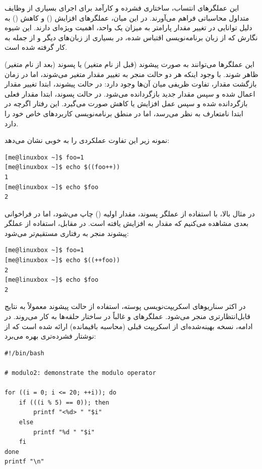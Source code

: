 این عملگرهای انتساب، ساختاری فشرده و کارآمد برای اجرای بسیاری از وظایف متداول محاسباتی فراهم می‌آورند. در این میان، عملگرهای افزایش (\cmd{++}) و کاهش (\cmd{--}) به دلیل توانایی در تغییر مقدار پارامتر به میزان یک واحد، اهمیت ویژه‌ای دارند. این شیوه نگارش که از زبان برنامه‌نویسی  اقتباس شده، در بسیاری از زبان‌های دیگر و از جمله  به کار گرفته شده است.

این عملگرها می‌توانند به صورت پیشوند (قبل از نام متغیر) یا پسوند (بعد از نام متغیر) ظاهر شوند. با وجود اینکه هر دو حالت منجر به تغییر مقدار متغیر می‌شوند، اما در زمان بازگشت مقدار، تفاوت ظریفی میان آن‌ها وجود دارد: در حالت پیشوند، ابتدا تغییر مقدار اعمال شده و سپس مقدار جدید بازگردانده می‌شود. در حالت پسوند، ابتدا مقدار فعلی بازگردانده شده و سپس عمل افزایش یا کاهش صورت می‌گیرد. این رفتار اگرچه در ابتدا نامتعارف به نظر می‌رسد، اما در منطق برنامه‌نویسی کاربردهای خاص خود را دارد.

نمونه زیر این تفاوت عملکردی را به خوبی نشان می‌دهد:

\begin{latin}
\begin{lstlisting}
[me@linuxbox ~]$ foo=1
[me@linuxbox ~]$ echo $((foo++))
1
[me@linuxbox ~]$ echo $foo
2
\end{lstlisting}
\end{latin}

در مثال بالا، با استفاده از عملگر پسوند، مقدار اولیه () چاپ می‌شود، اما در فراخوانی بعدی مشاهده می‌کنیم که مقدار به  افزایش یافته است. در مقابل، استفاده از عملگر پیشوند منجر به رفتاری مستقیم‌تر می‌شود:

\begin{latin}
\begin{lstlisting}
[me@linuxbox ~]$ foo=1
[me@linuxbox ~]$ echo $((++foo))
2
[me@linuxbox ~]$ echo $foo
2
\end{lstlisting}
\end{latin}

در اکثر سناریوهای اسکریپت‌نویسی پوسته، استفاده از حالت پیشوند معمولاً به نتایج قابل‌انتظارتری منجر می‌شود. عملگرهای \cmd{++} و \cmd{--} غالباً در ساختار حلقه‌ها به کار می‌روند. در ادامه، نسخه بهینه‌شده‌ای از اسکریپت قبلی (محاسبه باقیمانده) ارائه شده است که از نوشتار فشرده‌تری بهره می‌برد:

\begin{latin}
\begin{lstlisting}
#!/bin/bash

# modulo2: demonstrate the modulo operator

for ((i = 0; i <= 20; ++i)); do
    if (((i % 5) == 0)); then
        printf "<%d> " "$i"
    else
        printf "%d " "$i"
    fi
done
printf "\n"
\end{lstlisting}
\end{latin}

